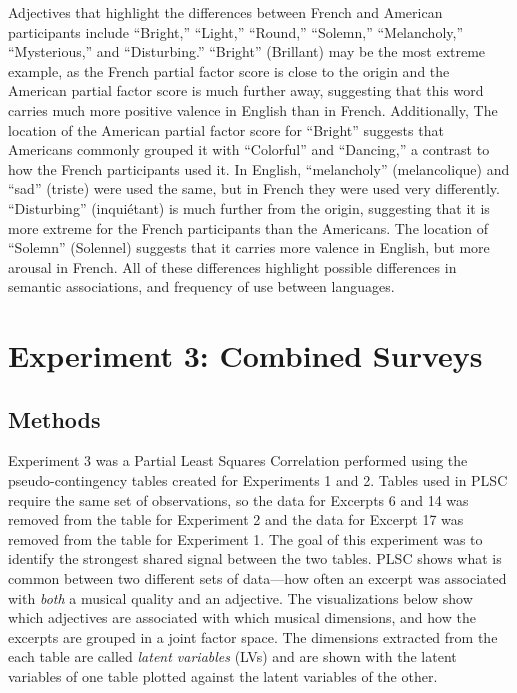 \documentclass[
  english,
  man,floatsintext]{apa6}
\begin{document}
Adjectives that highlight the differences between French and American participants include ``Bright,'' ``Light,'' ``Round,'' ``Solemn,'' ``Melancholy,'' ``Mysterious,'' and ``Disturbing.'' ``Bright'' (Brillant) may be the most extreme example, as the French partial factor score is close to the origin and the American partial factor score is much further away, suggesting that this word carries much more positive valence in English than in French. Additionally, The location of the American partial factor score for ``Bright'' suggests that Americans commonly grouped it with ``Colorful'' and ``Dancing,'' a contrast to how the French participants used it. In English, ``melancholy'' (melancolique) and ``sad'' (triste) were used the same, but in French they were used very differently. ``Disturbing'' (inquiétant) is much further from the origin, suggesting that it is more extreme for the French participants than the Americans. The location of ``Solemn'' (Solennel) suggests that it carries more valence in English, but more arousal in French. All of these differences highlight possible differences in semantic associations, and frequency of use between languages.

\hypertarget{experiment-3-combined-surveys}{%
\section{Experiment 3: Combined Surveys}\label{experiment-3-combined-surveys}}

\hypertarget{methods-2}{%
\subsection{Methods}\label{methods-2}}

Experiment 3 was a Partial Least Squares Correlation performed using the pseudo-contingency tables created for Experiments 1 and 2. Tables used in PLSC require the same set of observations, so the data for Excerpts 6 and 14 was removed from the table for Experiment 2 and the data for Excerpt 17 was removed from the table for Experiment 1.
The goal of this experiment was to identify the strongest shared signal between the two tables. PLSC shows what is common between two different sets of data---how often an excerpt was associated with \emph{both} a musical quality and an adjective. The visualizations below show which adjectives are associated with which musical dimensions, and how the excerpts are grouped in a joint factor space. The dimensions extracted from the each table are called \emph{latent variables} (LVs) and are shown with the latent variables of one table plotted against the latent variables of the other.
\end{document}
